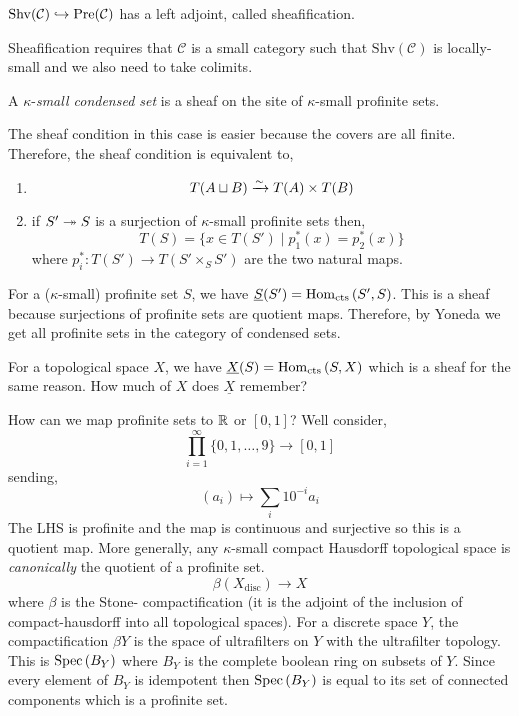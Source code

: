 \documentclass[12pt]{article}
\newcommand{\disc}{\text{disc}}
\newcommand{\Shv}{\mathrm{Shv}}
\newcommand{\Pre}{\mathrm{Pre}}
\newcommand{\cC}{\mathcal{C}}
\renewcommand{\Cech}{\text{\v{C}ech}\xspace}
\begin{document}
\begin{prop}
$\Shv(\cC) \embed \Pre(\cC)$ has a left adjoint, called sheafification. 
\end{prop}

\begin{rmk}
Sheafification requires that $\cC$ is a small category such that $\Shv(\cC)$ is locally-small and we also need to take colimits. 
\end{rmk}

\begin{defn}
A $\kappa$-\textit{small condensed set} is a sheaf on the site of $\kappa$-small profinite sets.  
\end{defn}

\begin{rmk}
The sheaf condition in this case is easier because the covers are all finite. Therefore, the sheaf condition is equivalent to,
\begin{enumerate}
\item \[ T(A \sqcup B) \xrightarrow{\sim} T(A) \times T(B) \]
\item if $S' \twoheadrightarrow S$ is a surjection of $\kappa$-small profinite sets then,
\[ T(S) = \{ x \in T(S') \mid p_1^*(x) = p_2^*(x) \} \]
where $p_i^* : T(S') \to T(S' \times_S S')$ are the two natural maps.
\end{enumerate}
\end{rmk}

\begin{example}
For a ($\kappa$-small) profinite set $S$, we have $\underline{S}(S') = \mathrm{Hom}_{\text{cts}} \left( S', S \right)$. This is a sheaf because surjections of profinite sets are quotient maps. Therefore, by Yoneda we get all profinite sets in the category of condensed sets.
\end{example}

\begin{example}
For a topological space $X$, we have $\underline{X}(S) = \mathrm{Hom}_{\text{cts}} \left( S, X \right)$ which is a sheaf for the same reason. How much of $X$ does $\underline{X}$ remember? 
\end{example}

\begin{example}
How can we map profinite sets to $\mathbb{R}$ or $[0,1]$? Well consider,
\[ \prod_{i = 1}^\infty \{ 0, 1, \dots, 9 \} \to [0,1] \]
sending,
\[ (a_i) \mapsto \sum_{i} 10^{-i} a_i \]
The LHS is profinite and the map is continuous and surjective so this is a quotient map. More generally, any $\kappa$-small compact Hausdorff topological space is \textit{canonically} the quotient of a profinite set. 
\[ \beta(X_{\disc}) \to X \]
where $\beta$ is the Stone-\Cech compactification (it is the adjoint of the inclusion of compact-hausdorff into all topological spaces). For a discrete space $Y$, the compactification $\beta Y$ is the space of ultrafilters on $Y$ with the ultrafilter topology. This is $\mathrm{Spec}\left( B_Y \right)$ where $B_Y$ is the complete boolean ring on subsets of $Y$. Since every element of $B_Y$ is idempotent then $\mathrm{Spec}\left( B_Y \right)$ is equal to its set of connected components which is a profinite set. 
\end{example}
\end{document}
